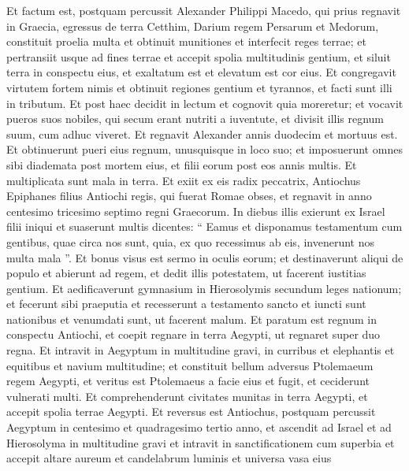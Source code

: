 \begin{biblechapter}
 \verse Et factum est, postquam percussit Alexander Philippi Macedo, qui prius regnavit in Graecia, egressus de terra Cetthim, Darium regem Persarum et Medorum, 
\verse constituit proelia multa et obtinuit munitiones et interfecit reges terrae; 
\verse et pertransiit usque ad fines terrae et accepit spolia multitudinis gentium, et siluit terra in conspectu eius, et exaltatum est et elevatum est cor eius. 
\verse Et congregavit virtutem fortem nimis et obtinuit regiones gentium et tyrannos, et facti sunt illi in tributum. 
\verse Et post haec decidit in lectum et cognovit quia moreretur; 
\verse et vocavit pueros suos nobiles, qui secum erant nutriti a iuventute, et divisit illis regnum suum, cum adhuc viveret. 
\verse Et regnavit Alexander annis duodecim et mortuus est. 
\verse Et obtinuerunt pueri eius regnum, unusquisque in loco suo; 
\verse et imposuerunt omnes sibi diademata post mortem eius, et filii eorum post eos annis multis. Et multiplicata sunt mala in terra.
 \verse Et exiit ex eis radix peccatrix, Antiochus Epiphanes filius Antiochi regis, qui fuerat Romae obses, et regnavit in anno centesimo tricesimo septimo regni Graecorum. 
\verse In diebus illis exierunt ex Israel filii iniqui et suaserunt multis dicentes: “ Eamus et disponamus testamentum cum gentibus, quae circa nos sunt, quia, ex quo recessimus ab eis, invenerunt nos multa mala ”. 
\verse Et bonus visus est sermo in oculis eorum; 
\verse et destinaverunt aliqui de populo et abierunt ad regem, et dedit illis potestatem, ut facerent iustitias gentium. 
 \verse Et aedificaverunt gymnasium in Hierosolymis secundum leges nationum; 
\verse et fecerunt sibi praeputia et recesserunt a testamento sancto et iuncti sunt nationibus et venumdati sunt, ut facerent malum.
 \verse Et paratum est regnum in conspectu Antiochi, et coepit regnare in terra Aegypti, ut regnaret super duo regna. 
\verse Et intravit in Aegyptum in multitudine gravi, in curribus et elephantis et equitibus et navium multitudine; 
 \verse et constituit bellum adversus Ptolemaeum regem Aegypti, et veritus est Ptolemaeus a facie eius et fugit, et ceciderunt vulnerati multi. 
\verse Et comprehenderunt civitates munitas in terra Aegypti, et accepit spolia terrae Aegypti. 
\verse Et reversus est Antiochus, postquam percussit Aegyptum in centesimo et quadragesimo tertio anno, et ascendit ad Israel et ad Hierosolyma in multitudine gravi 
\verse et intravit in sanctificationem cum superbia et accepit altare aureum et candelabrum luminis et universa vasa eius 

\end{biblechapter}
